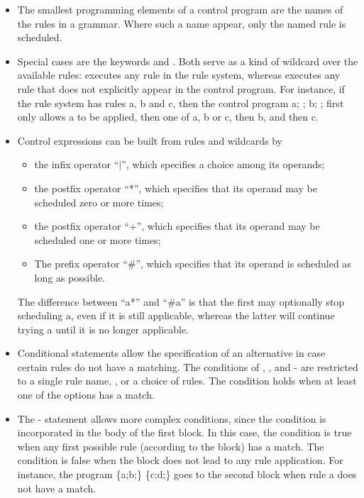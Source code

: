 \begin{itemize}
\item The smallest programming elements of a control program are the names of
  the rules in a grammar. Where such a name appear, only the named rule is scheduled.

\item Special cases are the keywords \anyK{} and \otherK. Both
  serve as a kind of wildcard over the available rules: \anyK{} executes
  any rule in the rule system, whereas \otherK{} executes any rule that
  does not explicitly appear in the control program. For instance, if the rule
  system has rules \textsf{a}, \textsf{b} and \textsf{c}, then the control
  program \textsf{a; \anyK; b; \otherK;} first only allows
  \textsf{a} to be applied, then one of \textsf{a}, \textsf{b} or \textsf{c},
  then \textsf{b}, and then \textsf{c}.

\item Control expressions can be built from rules and wildcards by 
\begin{itemize}\noitemsep
\item the infix operator ``\textsf{$|$}'', which specifies a choice among its
  operands;
\item the postfix operator ``\textsf{*}'', which specifies that its operand may
  be scheduled zero or more times;
\item the postfix operator ``\textsf{+}'', which specifies that its operand may
  be scheduled one or more times;
\item The prefix operator ``\textsf{\#}'', which specifies that its operand is
  scheduled as long as possible. 
\end{itemize}
The difference between ``\textsf{a*}'' and ``\textsf{\#a}'' is that the first
may optionally stop scheduling \textsf{a}, even if it is still applicable,
whereas the latter will continue trying \textsf{a} until it is no longer applicable.

\item Conditional statements allow the specification of an alternative in case
  certain rules do not have a matching. The conditions of \ifK,
  \whileK, \untilK{} and \doK-\whileK{} are restricted to a
  single rule name, \trueK, or a choice of rules. The condition holds
  when at least one of the options has a match.

\item The \tryK-\elseK{} statement allows more complex conditions, since the
  condition is incorporated in the body of the first block. In this case, the
  condition is true when any first possible rule (according to the block) has a
  match. The condition is false when the block does not lead to any rule
  application.  For instance, the program \textsf{\tryK{} \{a;b;\}
  \elseK{} \{c;d;\}} goes to the second block when rule \textsf{a}
  does not have a match.


\end{itemize}
